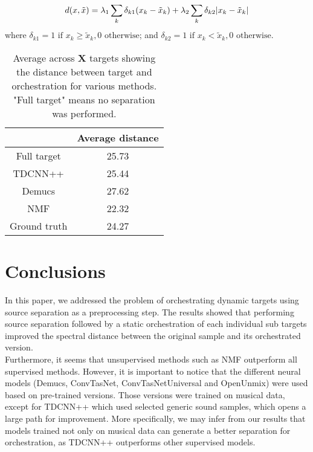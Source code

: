 \documentclass{article}
\begin{document}
		\begin{equation}\label{eqn:distance}
d(x, \tilde{x}) =\lambda_1 \sum_k \delta_{k1}(x_k - \tilde{x}_k) + \lambda_2 \sum_k \delta_{k2}|x_k - \tilde{x	}_k| \\
\end{equation}
where $\delta_{k1} = 1 \text{  if  } x_k \ge \tilde{x}_k, 0 \text{  otherwise}$; and $\delta_{k2} = 1 \text{  if  } x_k < \tilde{x}_k, 0 \text{  otherwise}$.
	
	
	\begin{table}[t]
		\begin{center}
			\begin{tabular}{|c|c|}
				\hline
				& Average distance \\
				\hline
				Full target & 25.73 \\
				\hline
				TDCNN++ & 25.44 \\
				\hline
				Demucs & 27.62 \\
				\hline
				NMF & 22.32 \\
				\hline
				Ground truth & 24.27 \\
				\hline
			\end{tabular}
		\end{center}
		\caption{Average across \textbf{X} targets showing the distance between target and orchestration for various methods. "Full target" means no separation was performed. }
		\label{tab:distances}
	\end{table}
	
	\section{Conclusions}\label{sec:conclusions}
	In this paper, we addressed the problem of orchestrating dynamic targets using source separation as a preprocessing step. The results showed that performing source separation followed by a static orchestration of each individual sub targets improved the spectral distance between the original sample and its orchestrated version.\\
	
	Furthermore, it seems that unsupervised methods such as NMF outperform all supervised methods. However, it is important to notice that the different neural models (Demucs, ConvTasNet, ConvTasNetUniversal and OpenUnmix) were used based on pre-trained versions. Those versions were trained on musical data, except for TDCNN++ which used selected generic sound samples, which opens a large path for improvement. More specifically, we may infer from our results that models trained not only on musical data can generate a better separation for orchestration, as TDCNN++ outperforms other supervised models.\\
	
\end{document}
